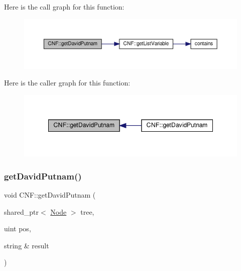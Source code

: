 Here is the call graph for this function\+:\nopagebreak
\begin{figure}[H]
\begin{center}
\leavevmode
\includegraphics[width=350pt]{dc/d0e/class_c_n_f_a029535415f1d5cf92c8023693ce7b40e_cgraph}
\end{center}
\end{figure}
Here is the caller graph for this function\+:\nopagebreak
\begin{figure}[H]
\begin{center}
\leavevmode
\includegraphics[width=348pt]{dc/d0e/class_c_n_f_a029535415f1d5cf92c8023693ce7b40e_icgraph}
\end{center}
\end{figure}
\mbox{\label{class_c_n_f_a0ae7d61f4d57fca35ff619af3300e63c}} 
\subsubsection{\texorpdfstring{get\+David\+Putnam()}{getDavidPutnam()}\hspace{0.1cm}{\footnotesize\ttfamily [2/2]}}
{\footnotesize\ttfamily void C\+N\+F\+::get\+David\+Putnam (\begin{DoxyParamCaption}\item[{shared\+\_\+ptr$<$ \hyperlink{class_node}{Node} $>$}]{tree,  }\item[{uint}]{pos,  }\item[{string \&}]{result }\end{DoxyParamCaption})\hspace{0.3cm}{\ttfamily [private]}}



